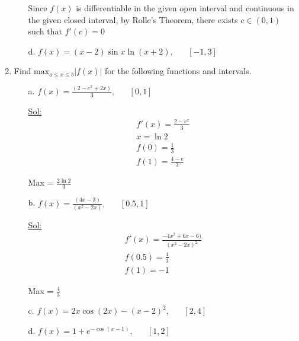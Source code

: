 \begin{enumerate}
\begin{itemize}
        Since $f(x)$ is differentiable in the given open interval and
        continuous in the given closed interval, by Rolle's Theorem,
        there exists $c \in (0, 1)$ such that $f'(c) = 0$

        \bigbreak
      \item[d.] $f(x) = (x - 2) \sin x \ln(x + 2), \hspace{20pt} [-1, 3]$
    \end{itemize}

  \item Find $\textrm{max}_{a \le x \le b} |f(x)|$ for the following
    functions and intervals.
    \begin{itemize}
      \item[a.] $f(x) = \frac{(2-e^x + 2x)}{3}, \hspace{20pt} [0, 1]$

        \underline{Sol:}\\

        $$
        \begin{array}{l}
          f'(x) = \frac{2-e^x}{3}\\
          x = \ln 2\\
          f(0) = \frac{1}{3}\\
          f(1) = \frac{4 - e}{3}
        \end{array}
        $$

        Max = $\frac{2 \ln 2}{3}$

        \bigbreak
      \item[b.] $f(x) = \frac{(4x-3)}{(x^2-2x)}, \hspace{20pt} [0.5, 1]$

        \underline{Sol:}\\

        $$
        \begin{array}{l}
        f'(x) = \frac{-4x^2 + 6x - 6)}{(x^2-2x)^2}\\
        f(0.5) = \frac{4}{3}\\
        f(1) = -1
      \end{array}
      $$

      Max = $\frac{4}{3}$

      \bigbreak
    \item[c.] $f(x) = 2x \cos(2x)-(x-2)^2, \hspace{20pt} [2, 4]$
    \item[d.] $f(x) = 1 + e^{- \cos(x-1)}, \hspace{20pt} [1, 2]$
  \end{itemize}


\end{enumerate}
